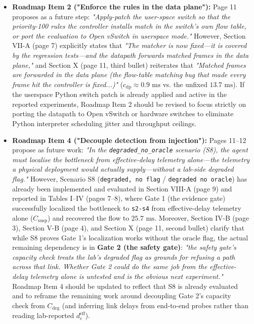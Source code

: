 \documentclass[11pt,a4paper]{article}
\begin{document}
\begin{itemize}[leftmargin=1.8em,itemsep=2pt]
\item \textbf{Roadmap Item 2 ("Enforce the rules in the data plane"):} Page 11 proposes as a future step: \emph{"Apply-patch the user-space switch so that the priority-100 rules the controller installs match in the switch's own flow table, or port the evaluation to Open vSwitch in userspace mode."} However, Section VII-A (page 7) explicitly states that \emph{"The matcher is now fixed—it is covered by the regression tests—and the datapath forwards matched frames in the data plane,"} and Section X (page 11, third bullet) reiterates that \emph{"Matched frames are forwarded in the data plane (the flow-table matching bug that made every frame hit the controller is fixed...)"} ($c_{\text{dp}} \approx 0.9\text{ ms}$ vs. the unfixed $13.7\text{ ms}$). If the userspace Python switch patch is already applied and active in the reported experiments, Roadmap Item 2 should be revised to focus strictly on porting the datapath to Open vSwitch or hardware switches to eliminate Python interpreter scheduling jitter and throughput ceilings.
\item \textbf{Roadmap Item 4 ("Decouple detection from injection"):} Pages 11–12 propose as future work: \emph{"In the \texttt{degraded\_no\_oracle} scenario (S8), the agent must localise the bottleneck from effective-delay telemetry alone—the telemetry a physical deployment would actually supply—without a lab-side degraded flag."} However, Scenario S8 (\texttt{degraded, no flag} / \texttt{degraded no oracle}) has already been implemented and evaluated in Section VIII-A (page 9) and reported in Tables I–IV (pages 7–8), where Gate 1 (the evidence gate) successfully localized the bottleneck to \texttt{s2-s4} from effective-delay telemetry alone ($C_{\text{susp}}$) and recovered the flow to $25.7\text{ ms}$. Moreover, Section IV-B (page 3), Section V-B (page 4), and Section X (page 11, second bullet) clarify that while S8 proves Gate 1's localization works without the oracle flag, the actual remaining dependency is in \textbf{Gate 2 (the safety gate)}: \emph{"the safety gate's capacity check treats the lab's degraded flag as grounds for refusing a path across that link. Whether Gate 2 could do the same job from the effective-delay telemetry alone is untested and is the obvious next experiment."} Roadmap Item 4 should be updated to reflect that S8 is already evaluated and to reframe the remaining work around decoupling Gate 2's capacity check from $C_{\text{deg}}$ (and inferring link delays from end-to-end probes rather than reading lab-reported $d_e^{\text{eff}}$).

\end{itemize}
\end{document}
